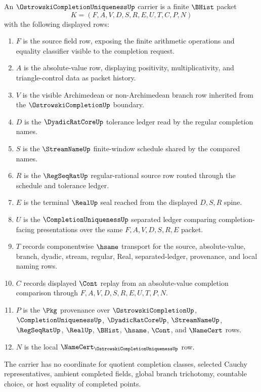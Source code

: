 \begin{definition}
\label{def:ostrowski-completion-uniqueness-carrier}
An $\OstrowskiCompletionUniquenessUp$ carrier is a finite $\BHist$ packet
$$
K=(F,A,V,D,S,R,E,U,T,C,P,N)
$$
with the following displayed rows:
\begin{enumerate}
\item $F$ is the source field row, exposing the finite arithmetic operations and equality classifier visible to the completion request.
\item $A$ is the absolute-value row, displaying positivity, multiplicativity, and triangle-control data as packet history.
\item $V$ is the visible Archimedean or non-Archimedean branch row inherited from the $\OstrowskiCompletionUp$ boundary.
\item $D$ is the $\DyadicRatCoreUp$ tolerance ledger read by the regular completion names.
\item $S$ is the $\StreamNameUp$ finite-window schedule shared by the compared names.
\item $R$ is the $\RegSeqRatUp$ regular-rational source row routed through the schedule and tolerance ledger.
\item $E$ is the terminal $\RealUp$ seal reached from the displayed $D,S,R$ spine.
\item $U$ is the $\CompletionUniquenessUp$ separated ledger comparing completion-facing presentations over the same $F,A,V,D,S,R,E$ packet.
\item $T$ records componentwise $\hsame$ transport for the source, absolute-value, branch, dyadic, stream, regular, Real, separated-ledger, provenance, and local naming rows.
\item $C$ records displayed $\Cont$ replay from an absolute-value completion comparison through $F,A,V,D,S,R,E,U,T,P,N$.
\item $P$ is the $\Pkg$ provenance over $\OstrowskiCompletionUp$, $\CompletionUniquenessUp$, $\DyadicRatCoreUp$, $\StreamNameUp$, $\RegSeqRatUp$, $\RealUp$, $\BHist$, $\hsame$, $\Cont$, and $\NameCert$ rows.
\item $N$ is the local $\NameCert_{\OstrowskiCompletionUniquenessUp}$ row.
\end{enumerate}
The carrier has no coordinate for quotient completion classes, selected Cauchy representatives, ambient completed fields, global branch trichotomy, countable choice, or host equality of completed points.
\end{definition}

